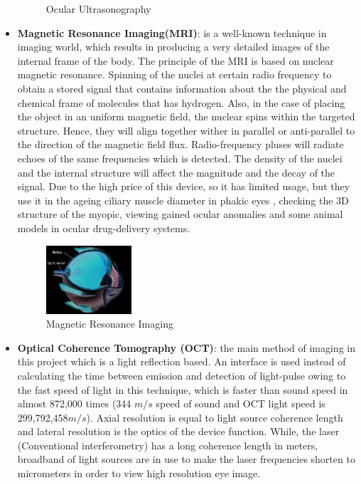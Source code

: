 \begin{itemize}
\begin{figure}[htb]
  \caption{Ocular Ultrasonography \cite{ocularultra}}
  \label{fig:Glaucoma}
\end{figure}
\item \textbf{Magnetic Resonance Imaging(MRI)}: is a well-known technique in imaging world, which results in producing a very detailed images of the internal frame of the body.
The principle of the MRI is based on nuclear magnetic resonance.
Spinning of the nuclei at certain radio frequency to obtain a stored signal that contains information about the the physical and chemical frame of molecules that has hydrogen.
Also, in the case of placing the object in an uniform magnetic field, the nuclear spins within the targeted structure.
Hence, they will align together wither in parallel or anti-parallel to the direction of the magnetic field flux.
Radio-frequency pluses will radiate echoes of the same frequencies which is detected.
The density of the nuclei and the internal structure will affect the magnitude and the decay of the signal.
Due to the high price of this device, so it has limited usage, but they use it in the ageing ciliary muscle diameter in phakic eyes \cite{strenk2004magnetic}, checking the 3D structure of the myopic, viewing gained ocular anomalies and some animal models in ocular drug-delivery systems\cite{kim2007assessment}.
\begin{figure}[htb]
        \centering
        \includegraphics[width=0.3\textwidth]{figures/MRI.jpg} %
  \caption{Magnetic Resonance Imaging \cite{MRI2016}}
  \label{fig:Glaucoma}
\end{figure}
\item \textbf{Optical Coherence Tomography (OCT)}: the main method of imaging in this project which is a light reflection based.
An interface is used instead of calculating the time between emission and detection of light-pulse owing to the fast speed of light in this technique, which is faster than sound speed in almost 872,000 times (344 $m/s$ speed of sound and OCT light speed is 299,792,458$m/s$).
Axial resolution is equal to light source coherence length and lateral resolution is the optics of the device function.
While, the laser (Conventional interferometry) has a long coherence length in meters, broadband of light sources are in use to make the laser frequencies shorten to micrometers in order to view high resolution eye image.

\end{itemize}
